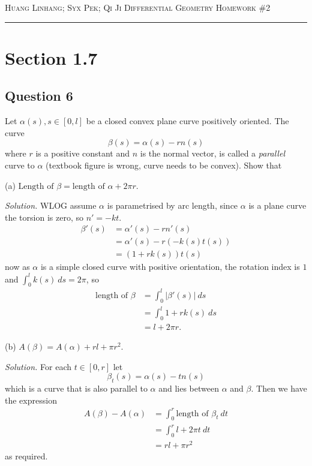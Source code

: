 \documentclass[12pt]{article}
\begin{document}
\thispagestyle{empty}

{\scshape Huang Linhang; Syx Pek; Qi Ji} \hfill {\scshape \large Differential Geometry} \hfill {\scshape Homework \#2}

\smallskip
\hrule
\bigskip

\section{Section 1.7}

\subsection*{Question 6}

Let \(\alpha(s), s\in[0,l]\) be a closed convex plane curve positively oriented. The curve \[\beta(s) = \alpha(s) - rn(s)\]
where \(r\) is a positive constant and \(n\) is the normal vector, is called a \emph{parallel} curve to \(\alpha\) (textbook figure is wrong, curve needs to be convex).
Show that

(a) \(\text{Length of }\beta = \text{length of }\alpha + 2\pi r\).

\textit{Solution.}
WLOG assume \(\alpha\) is parametrised by arc length, since \(\alpha\) is a plane curve the torsion is zero, so \(n' = -kt\).
\begin{align*}
    \beta'(s) &= \alpha'(s) - r n'(s) \\
              &= \alpha'(s) - r(-k(s) t(s)) \\
              &= (1+rk(s))t(s)
\end{align*}
now as \(\alpha\) is a simple closed curve with positive orientation, the rotation index is \(1\) and \(\int_0^l k(s)\ ds = 2\pi\), so
\begin{align*}
    \text{length of }\beta
    &= \int_0^l \left\lvert \beta'(s) \right\rvert\ ds \\
    &= \int_0^l 1 + r k(s) \ ds \\
    &= l + 2\pi r.
\end{align*}

(b) \(A(\beta) = A(\alpha) + rl + \pi r^2\).

\textit{Solution.}
For each \(t\in[0,r]\) let
\[\beta_t(s) = \alpha(s) - t n(s)\]
which is a curve that is also parallel to \(\alpha\) and lies between \(\alpha\) and \(\beta\).
Then we have the expression
\begin{align*}
    A(\beta) - A(\alpha) &= \int_0^r \text{length of }\beta_t \ dt \\
                         &= \int_0^r l + 2\pi t\ dt \\
                         &= rl + \pi r^2
\end{align*}
as required.
\end{document}

